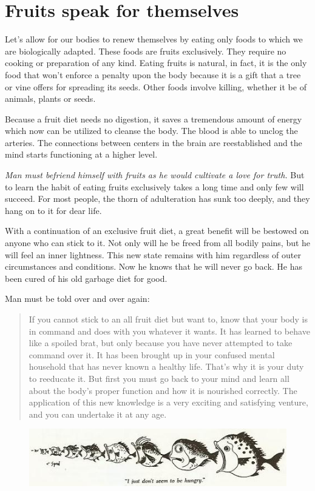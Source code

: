 \documentclass[12pt,letterpaper]{article}
\begin{document}
\section{Fruits speak for themselves}

Let's allow for our bodies to renew themselves by eating only foods to
which we are biologically adapted. These foods are fruits
exclusively. They require no cooking or preparation of any
kind. Eating fruits is natural, in fact, it is the only food that
won't enforce a penalty upon the body because it is a gift that a tree
or vine offers for spreading its seeds. Other foods involve killing,
whether it be of animals, plants or seeds.

Because a fruit diet needs no digestion, it saves a tremendous amount
of energy which now can be utilized to cleanse the body. The blood is
able to unclog the arteries. The connections between centers in the
brain are reestablished and the mind starts functioning at a higher
level.

\emph{Man must befriend himself with fruits as he would cultivate a
love for truth.} But to learn the habit of eating fruits exclusively
takes a long time and only few will succeed. For most people, the
thorn of adulteration has sunk too deeply, and they hang on to it for
dear life.

With a continuation of an exclusive fruit diet, a great benefit will
be bestowed on anyone who can stick to it. Not only will he be freed
from all bodily pains, but he will feel an inner lightness. This new
state remains with him regardless of outer circumstances and
conditions. Now he knows that he will never go back. He has been cured
of his old garbage diet for good.

Man must be told over and over again:
\begin{quote} If you cannot stick to an all fruit diet but want to,
know that your body is in command and does with you whatever it
wants. It has learned to behave like a spoiled brat, but only because
you have never attempted to take command over it. It has been brought
up in your confused mental household that has never known a healthy
life. That's why it is your duty to reeducate it.  But first you must
go back to your mind and learn all about the body's proper function
and how it is nourished correctly. The application of this new
knowledge is a very exciting and satisfying venture, and you can
undertake it at any age.
\end{quote}

\begin{figure} \centering
  \includegraphics[width=\textwidth,bb= 0 0 465 104]{p19.jpg}
\end{figure}
\end{document}
